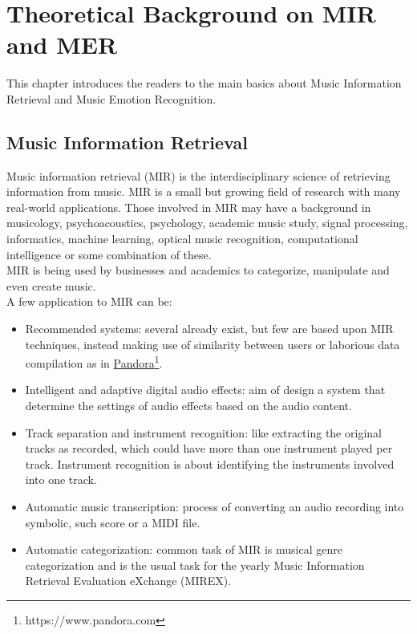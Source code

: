 \chapter{Theoretical Background on MIR and MER}
\label{chap:TheoreticalBackgroundMIRMER}
\pagestyle{plain}
\vspace{0.5cm}

\noindent This chapter introduces the readers to the main basics about Music Information Retrieval and Music Emotion Recognition.

\section{Music Information Retrieval}
Music information retrieval (MIR) is the interdisciplinary science of retrieving information from music. MIR is a small but growing field of research with many real-world applications. Those involved in MIR may have a background in musicology, psychoacoustics, psychology, academic music study, signal processing, informatics, machine learning, optical music recognition, computational intelligence or some combination of these.
\\ \indent
MIR is being used by businesses and academics to categorize, manipulate and even create music.
\\
A few application to MIR can be:
\begin{itemize}
	\item Recommended systems: several already exist, but few are based upon MIR techniques, instead making use of similarity between users or laborious data compilation as in \href{https://www.pandora.com}{Pandora}\footnote{https://www.pandora.com}.
	\item Intelligent and adaptive digital audio effects: aim of design a system that determine the settings of audio effects based on the audio content.
	\item Track separation and instrument recognition: like extracting the original tracks as recorded, which could have more than one instrument played per track. Instrument recognition is about identifying the instruments involved into one track.
	\item Automatic music transcription: process of converting an audio recording into symbolic, such score or a MIDI file.
	\item Automatic categorization: common task of MIR is musical genre categorization and is the usual task for the yearly Music Information Retrieval Evaluation eXchange (MIREX).
\end{itemize}

